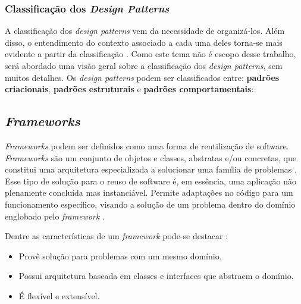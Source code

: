 \subsubsection{Classificação dos \textit{Design Patterns}}
A classificação dos \textit{design patterns} vem da necessidade de organizá-los. Além disso, o entendimento do contexto associado a cada uma deles torna-se mais evidente a partir da classificação \cite{gammaEtAl1994}. Como este tema não é escopo desse trabalho, será abordado uma visão geral sobre a classificação dos \textit{design patterns}, sem muitos detalhes. Os \textit{design patterns} podem ser classificados entre: \textbf{padrões criacionais}, \textbf{padrões estruturais} e \textbf{padrões comportamentais}:

\subsection{\textit{Frameworks}}
\textit{Frameworks} podem ser definidos como uma forma de reutilização de software. \textit{Frameworks} são um conjunto de objetos e classes, abstratas e/ou concretas, que constitui uma arquitetura especializada a solucionar uma família de problemas \cite{barretoJunior2006}. Esse tipo de solução para o reuso de software é, em essência, uma aplicação não plenamente concluída mas instanciável. Permite adaptações no código para um funcionamento específico, visando a solução de um problema dentro do domínio englobado pelo \textit{framework} \cite{barretoJunior2006}.
\par
\indent Dentre as características de um \textit{framework} pode-se destacar \cite{sauve2006}:
\begin{itemize}
\item Provê solução para problemas com um mesmo domínio.
\item Possui arquitetura baseada em classes e interfaces que abstraem o domínio.
\item É flexível e extensível.
\end{itemize}
\par

